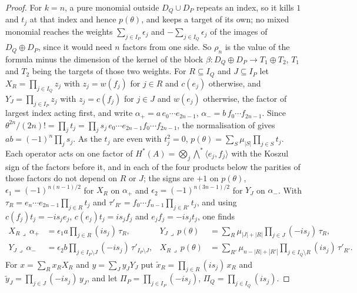 \documentclass[11pt,reqno]{amsart}
\theoremstyle{plain}
\theoremstyle{definition}
\theoremstyle{remark}
\begin{document}
\begin{proof}
For $k=n$, a pure monomial outside $D_{Q}\cup D_{P}$ repeats an index, so it
kills $1$ and $t_{j}$ at that index and hence $p(\theta)$, and keeps a target
of its own; no mixed monomial reaches the weights $\sum_{j\in I_{P}}
\epsilon_{j}$ and $-\sum_{j\in I_{Q}}\epsilon_{j}$ of the images of
$D_{Q}\oplus D_{P}$, since it would need $n$ factors from one side. So
$\rho_{n}$ is the value of the formula minus the dimension of the kernel of the
block $\beta\colon D_{Q}\oplus D_{P}\to T_{1}\oplus T_{2}$, $T_{1}$ and $T_{2}$
being the targets of those two weights. For $R\subseteq I_{Q}$ and
$J\subseteq I_{P}$ let $X_{R}=\prod_{j\in I_{Q}}z_{j}$ with $z_{j}=w(f_{j})$ for
$j\in R$ and $c(e_{j})$ otherwise, and $Y_{J}=\prod_{j\in I_{P}}z_{j}$ with
$z_{j}=c(f_{j})$ for $j\in J$ and $w(e_{j})$ otherwise, the factor of largest
index acting first, and write $\alpha_{+}=a\,e_{0}\cdots e_{2n-1}$,
$\alpha_{-}=b\,f_{0}\cdots f_{2n-1}$. Since
$\theta^{2n}/(2n)!=\prod_{j}t_{j}=\prod_{j}s_{j}\,e_{0}\cdots e_{2n-1}
f_{0}\cdots f_{2n-1}$, the normalisation of  gives
$ab=(-1)^{n}\prod_{j}s_{j}$. As the $t_{j}$ are even with $t_{j}^{2}=0$,
$p(\theta)=\sum_{S}\mu_{|S|}\prod_{j\in S}t_{j}$. Each operator acts on one
factor of $H^{*}(A)=\bigotimes_{j}\bigwedge^{*}\langle e_{j},f_{j}\rangle$
with the Koszul sign of the factors before it, and in each of the four
products below the parities of those factors do not depend on $R$ or $J$;
the signs are $+1$ on $p(\theta)$, $\epsilon_{1}=(-1)^{n(n-1)/2}$ for $X_{R}$ on
$\alpha_{+}$ and $\epsilon_{2}=(-1)^{n(3n-1)/2}$ for $Y_{J}$ on $\alpha_{-}$.
With $\tau_{R}=e_{n}\cdots e_{2n-1}\prod_{j\in R}t_{j}$ and
$\tau'_{R'}=f_{0}\cdots f_{n-1}\prod_{j\in R'}t_{j}$, and using
$c(f_{j})t_{j}=-is_{j}e_{j}$, $c(e_{j})t_{j}=is_{j}f_{j}$ and
$e_{j}f_{j}=-is_{j}t_{j}$, one finds
\begin{align*}
  X_{R}\lrcorner\,\alpha_{+}&=\epsilon_{1}a\prod_{j\in R}(is_{j})\,\tau_{R},&
  Y_{J}\lrcorner\,p(\theta)&=\sum_{R}\mu_{|J|+|R|}\prod_{j\in J}(-is_{j})\,\tau_{R},\\
  Y_{J}\lrcorner\,\alpha_{-}&=\epsilon_{2}b\prod_{j\in I_{P}\setminus J}(-is_{j})\,
    \tau'_{I_{P}\setminus J},&
  X_{R}\lrcorner\,p(\theta)&=\sum_{R'}\mu_{n-|R|+|R'|}\prod_{j\in I_{Q}\setminus R}
    (is_{j})\,\tau'_{R'}.
\end{align*}
For $x=\sum_{R}x_{R}X_{R}$ and $y=\sum_{J}y_{J}Y_{J}$ put
$\tilde x_{R}=\prod_{j\in R}(is_{j})\,x_{R}$ and
$\tilde y_{J}=\prod_{j\in J}(-is_{j})\,y_{J}$, and let
$\Pi_{P}=\prod_{j\in I_{P}}(-is_{j})$, $\Pi_{Q}=\prod_{j\in I_{Q}}(is_{j})$.

\end{proof}
\end{document}
